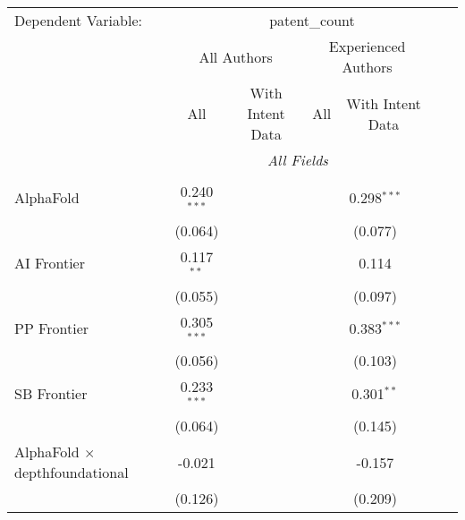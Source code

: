 \begingroup
\centering
\begin{tabular}{lcccccccc}
   \tabularnewline \midrule \midrule
   Dependent Variable: & \multicolumn{8}{c}{patent\_count}\\
 & \multicolumn{3}{c}{All Authors} & \multicolumn{3}{c}{Experienced Authors} \\
\cmidrule(lr){2-4} \cmidrule(lr){5-7}
 & \multicolumn{1}{c}{All} & \multicolumn{2}{c}{With Intent Data} & \multicolumn{1}{c}{All} & \multicolumn{2}{c}{With Intent Data} \\
\cmidrule(lr){2-2} \cmidrule(lr){3-4} \cmidrule(lr){5-5} \cmidrule(lr){6-7}
 & \multicolumn{6}{c}{\textit{All Fields}} \\ \\
   AlphaFold                                      & 0.240$^{***}$ &              &        &        & 0.298$^{***}$ &               &        &   \\   
                                                  & (0.064)       &              &        &        & (0.077)       &               &        &   \\   
   AI Frontier                                    & 0.117$^{**}$  &              &        &        & 0.114         &               &        &   \\   
                                                  & (0.055)       &              &        &        & (0.097)       &               &        &   \\   
   PP Frontier                                    & 0.305$^{***}$ &              &        &        & 0.383$^{***}$ &               &        &   \\   
                                                  & (0.056)       &              &        &        & (0.103)       &               &        &   \\   
   SB Frontier                                    & 0.233$^{***}$ &              &        &        & 0.301$^{**}$  &               &        &   \\   
                                                  & (0.064)       &              &        &        & (0.145)       &               &        &   \\   
   AlphaFold $\times$ depthfoundational           & -0.021        &              &        &        & -0.157        &               &        &   \\   
                                                  & (0.126)       &              &        &        & (0.209)       &               &        &   \\   

\end{tabular}
